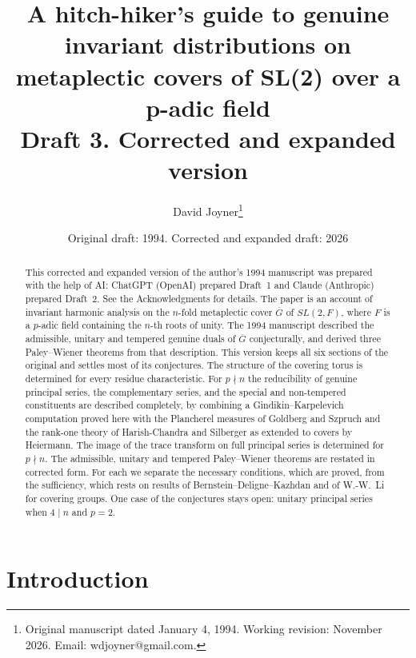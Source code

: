 \documentclass[12pt,letterpaper]{article}
\numberwithin{equation}{section}
\theoremstyle{definition}
\newcommand{\bG}{\overline{G}}
\begin{document}
\author{David Joyner\thanks{Original manuscript dated January 4, 1994. Working revision: November 2026. Email: wdjoyner@gmail.com.}}
\title{A hitch-hiker's guide to genuine invariant distributions on metaplectic
covers of SL(2) over a p-adic field\\[4pt]\large Draft 3. Corrected and expanded version}
\date{Original draft: 1994. Corrected and expanded draft: 2026}
\maketitle

\begin{abstract}
This corrected and expanded version of the author's 1994 manuscript was prepared with the
help of AI: ChatGPT (OpenAI) prepared Draft~1 and Claude (Anthropic) prepared Draft~2.
See the Acknowledgments for details.  The paper is an account of invariant harmonic
analysis on the $n$-fold metaplectic cover $\bG$ of $SL(2,F)$, where $F$ is a $p$-adic
field containing the $n$-th roots of unity.  The 1994 manuscript described the admissible,
unitary and tempered genuine duals of $\bG$ conjecturally, and derived three Paley--Wiener
theorems from that description.  This version keeps all six sections of the original and
settles most of its conjectures.  The structure of the covering torus is determined for
every residue characteristic.  For $p\nmid n$ the reducibility of genuine principal series,
the complementary series, and the special and non-tempered constituents are described
completely, by combining a Gindikin--Karpelevich computation proved here with the Plancherel
measures of Goldberg and Szpruch and the rank-one theory of Harish-Chandra and Silberger as
extended to covers by Heiermann.  The image of the trace transform on full principal series
is determined for $p\nmid n$.  The admissible, unitary and tempered Paley--Wiener theorems
are restated in corrected form.  For each we separate the necessary conditions, which are
proved, from the sufficiency, which rests on results of Bernstein--Deligne--Kazhdan and of
W.-W.~Li for covering groups.  One case of the conjectures stays open: unitary principal
series when $4\mid n$ and $p=2$.
\end{abstract}

\tableofcontents

\section{Introduction}\label{sec:intro}
\end{document}
